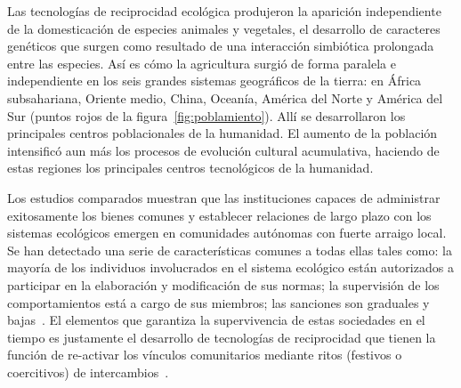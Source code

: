 \documentclass[a4paper,11pt]{book}
\theoremstyle{definition}
\begin{document}

Las tecnolog\'ias de reciprocidad ecol\'ogica produjeron la aparici\'on independiente de la domesticaci\'on de especies animales y vegetales, el desarrollo de caracteres gen\'eticos que surgen como resultado de una interacci\'on simbi\'otica prolongada entre las especies.
%
Así es cómo la agricultura surgi\'o de forma paralela e independiente en los seis grandes sistemas geogr\'aficos de la tierra: en África subsahariana, Oriente medio, China, Oceanía, América del Norte y América del Sur (puntos rojos de la figura~\ref{fig:poblamiento}).
%
All\'i se desarrollaron los principales centros poblacionales de la humanidad.
El aumento de la poblaci\'on intensificó aun más los procesos de evolución cultural acumulativa, haciendo de estas regiones los principales centros tecnológicos de la humanidad.


Los estudios comparados muestran que las instituciones capaces de administrar exitosamente los bienes comunes y establecer relaciones de largo plazo con los sistemas ecológicos emergen en comunidades autónomas con fuerte arraigo local.
%
Se han detectado una serie de características comunes a todas ellas tales como: la mayoría de los individuos involucrados en el sistema ecológico están autorizados a participar en la elaboración y modificación de sus normas; la supervisión de los comportamientos está a cargo de sus miembros; las sanciones son graduales y bajas~\cite{ ostrom2010}.
%
El elementos que garantiza la supervivencia de estas sociedades en el tiempo es justamente el desarrollo de tecnologías de reciprocidad que tienen la función de re-activar los vínculos comunitarios mediante ritos (festivos o coercitivos) de intercambios~\cite{zaffaroni2013-cuestionCriminal, segato2016-guerraContraLasMujeres}.
\end{document}
